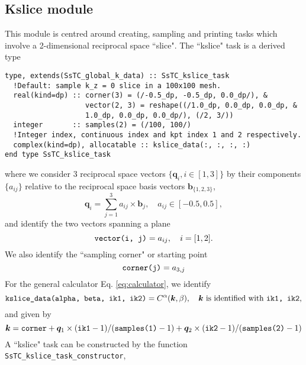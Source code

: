 \documentclass[10pt,a4paper]{article}
\begin{document}
\subsection{Kslice module}
This module is centred around creating, sampling and printing tasks which involve a 2-dimensional reciprocal space ``slice". The ``kslice" task is a derived type
\begin{lstlisting}[caption={Derived type corresponding to a ``kslice" task.},captionpos=b]
type, extends(SsTC_global_k_data) :: SsTC_kslice_task
  !Default: sample k_z = 0 slice in a 100x100 mesh.
  real(kind=dp) :: corner(3) = (/-0.5_dp, -0.5_dp, 0.0_dp/), &
                   vector(2, 3) = reshape((/1.0_dp, 0.0_dp, 0.0_dp, &
                   1.0_dp, 0.0_dp, 0.0_dp/), (/2, 3/))
  integer       :: samples(2) = (/100, 100/)
  !Integer index, continuous index and kpt index 1 and 2 respectively.
  complex(kind=dp), allocatable :: kslice_data(:, :, :, :)
end type SsTC_kslice_task
\end{lstlisting}
where we consider 3 reciprocal space vectors $\{\bm{q}_i, i\in[1, 3]\}$ by their components $\{a_{ij}\}$ relative to the reciprocal space basis vectors $\bm{b}_{\{1, 2, 3\}}$,
\begin{equation}\label{eq:vec_coords_slice}
\bm{q}_i = \sum_{j=1}^3 a_{ij}\times \bm{b}_j, \quad a_{ij}\in\left[-0.5, 0.5\right],
\end{equation}
and identify the two vectors spanning a plane
\begin{equation}
\verb|vector(i, j)| = a_{ij}, \quad i = [1, 2].
\end{equation}
We also identify the ``sampling corner" or starting point
\begin{equation}
\verb|corner(j)| = a_{3, j}
\end{equation}
For the general calculator Eq. \eqref{eq:calculator}, we identify
\begin{equation}
\verb|kslice_data(alpha, beta, ik1, ik2)| = C^{\alpha}(\bm{k},\beta),\quad \bm{k}\text{ is identified with } \verb|ik1, ik2|,
\end{equation}
and given by
\begin{equation}
\bm{k} = \verb|corner| + \bm{q}_1\times (\verb|ik1|-1)/(\verb|samples(1)| - 1) + \bm{q}_2\times (\verb|ik2|-1)/(\verb|samples(2)| - 1)
\end{equation}
A ``kslice" task can be constructed by the function \verb|SsTC_kslice_task_constructor|,
\end{document}
